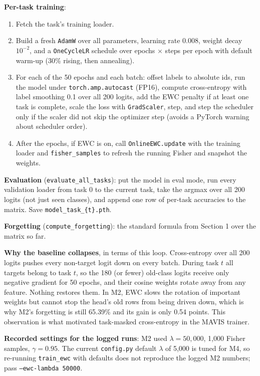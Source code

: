 \documentclass[11pt,a4paper]{article}
\newcommand{\code}[1]{\texttt{#1}}
\begin{document}
\textbf{Per-task training}:
\begin{enumerate}
  \item Fetch the task's training loader.
  \item Build a fresh \code{AdamW} over all parameters, learning rate 0.008, weight decay $10^{-2}$, and a \code{OneCycleLR} schedule over epochs $\times$ steps per epoch with default warm-up (30\% rising, then annealing).
  \item For each of the 50 epochs and each batch: offset labels to absolute ids, run the model under \code{torch.amp.autocast} (FP16), compute cross-entropy with label smoothing 0.1 over all 200 logits, add the EWC penalty if at least one task is complete, scale the loss with \code{GradScaler}, step, and step the scheduler only if the scaler did not skip the optimizer step (avoids a PyTorch warning about scheduler order).
  \item After the epochs, if EWC is on, call \code{OnlineEWC.update} with the training loader and \code{fisher\_samples} to refresh the running Fisher and snapshot the weights.
\end{enumerate}

\textbf{Evaluation} (\code{evaluate\_all\_tasks}): put the model in eval mode, run every validation loader from task 0 to the current task, take the argmax over all 200 logits (not just seen classes), and append one row of per-task accuracies to the matrix. Save \code{model\_task\_\{t\}.pth}.

\textbf{Forgetting} (\code{compute\_forgetting}): the standard formula from Section 1 over the matrix so far.

\textbf{Why the baseline collapses}, in terms of this loop. Cross-entropy over all 200 logits pushes every non-target logit down on every batch. During task $t$ all targets belong to task $t$, so the 180 (or fewer) old-class logits receive only negative gradient for 50 epochs, and their cosine weights rotate away from any feature. Nothing restores them. In M2, EWC slows the rotation of important weights but cannot stop the head's old rows from being driven down, which is why M2's forgetting is still 65.39\% and its gain is only 0.54 points. This observation is what motivated task-masked cross-entropy in the MAVIS trainer.

\textbf{Recorded settings for the logged runs}: M2 used $\lambda = 50{,}000$, 1{,}000 Fisher samples, $\gamma = 0.95$. The current \code{config.py} default $\lambda$ of 5{,}000 is tuned for M4, so re-running \code{train\_ewc} with defaults does not reproduce the logged M2 numbers; pass \code{--ewc-lambda 50000}.
\end{document}
